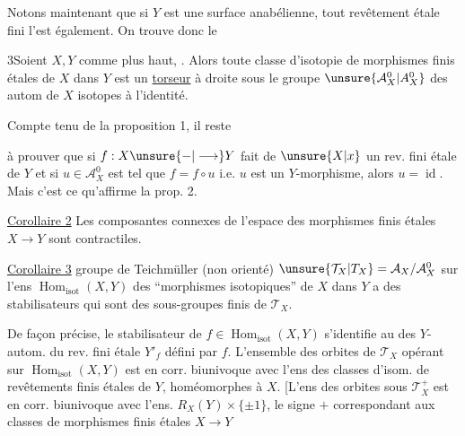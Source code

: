 Notons maintenant que si $Y$ est une surface  anabélienne, tout revêtement étale fini l'est également. On trouve donc le

  3\quad Soient $X,Y$  comme plus haut, .
Alors toute classe d'isotopie de morphismes finis étales de $X$ dans $Y$ est un \uline{torseur} à droite sous le groupe $\unsure{\mathcal{A}_X^0|A_X^0}$ des autom de $X$ isotopes à l'identité.

Compte tenu de la proposition 1, il reste

à prouver que si $f:X\unsure{-|\longrightarrow}Y$ fait de $\unsure{X|x}$ un rev. fini étale de $Y$ et si $u\in\mathcal{A}_X^0$ est tel que $f=f\circ u$ i.e. $u$ est un $Y$-morphisme, alors $u=\operatorname{id}$. Mais c'est ce qu'affirme la prop. 2.

\uline{Corollaire 2} Les composantes connexes de l'espace des morphismes finis étales $X\longrightarrow Y$ sont contractiles.

\uline{Corollaire 3}   groupe de Teichmüller (non orienté) $\unsure{\mathcal{T}_X|T_X}=\mathcal{A}_X/\mathcal{A}_X^0$ sur l'ens $\operatorname{Hom}_{\mathrm{isot}}(X,Y)$ des ``morphismes isotopiques'' de $X$ dans $Y$  a des stabilisateurs qui sont des sous-groupes finis de $\mathcal{T}_X$.

De façon précise, le stabilisateur de $f\in\operatorname{Hom}_{\mathrm{isot}}(X,Y)$ s'identifie au    des $Y$-autom. du rev. fini étale $Y'_f$ défini par $f$. L'ensemble des orbites de $\mathcal{T}_X$ opérant sur $\operatorname{Hom}_{\mathrm{isot}}(X,Y)$ est en corr. biunivoque avec l'ens  des classes d'isom. de revêtements finis étales de $Y$, homéomorphes à $X$.
[L'ens des orbites sous $\mathcal{T}_X^+$ est en corr. biunivoque avec l'ens. $R_X(Y)\times\{\pm1\}$, le signe $+$  correspondant aux classes de morphismes finis étales $X\longrightarrow Y$

